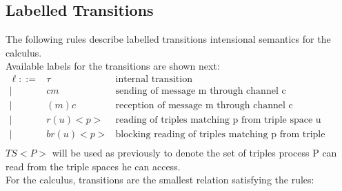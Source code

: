 \subsection{Labelled Transitions}
The following rules describe labelled transitions intensional semantics for the calculus.\\
Available labels for the transitions are shown next:
\begin{eqnarray*}
  \ell  ::= & \tau & \mbox{internal transition} \\
        |    &  cm  & \mbox{sending of message m through channel c} \\
        |    & (m)c  & \mbox{reception of message m through channel c} \\
        |    & r(u)<p>  & \mbox{reading of triples matching p from triple space u} \\
        |    & br(u)<p>  & \mbox{blocking reading of triples matching p from triple space u} \\
\end{eqnarray*}
$TS<P>$ will be used as previously to denote the set of triples process P can read from the triple spaces he can access.\\
For the calculus, transitions are the smallest relation satisfying the rules:

